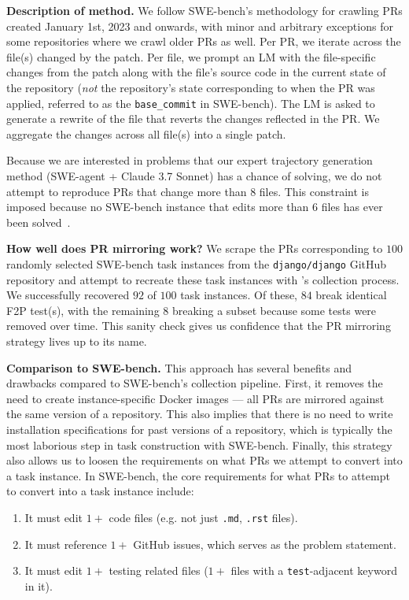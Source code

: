 \textbf{Description of method.} We follow SWE-bench's methodology for crawling PRs created January 1st, 2023 and onwards, with minor and arbitrary exceptions for some repositories where we crawl older PRs as well.
Per PR, we iterate across the file(s) changed by the patch.
Per file, we prompt an LM with the file-specific changes from the patch along with the file's source code in the current state of the repository (\textit{not} the repository's state corresponding to when the PR was applied, referred to as the \texttt{base\_commit} in SWE-bench).
The LM is asked to generate a rewrite of the file that reverts the changes reflected in the PR.
We aggregate the changes across all file(s) into a single patch.

Because we are interested in problems that our expert trajectory generation method (SWE-agent + Claude 3.7 Sonnet) has a chance of solving, we do not attempt to reproduce PRs that change more than $8$ files.
This constraint is imposed because no SWE-bench instance that edits more than $6$ files has ever been solved~\citep{jimenez2024leaderboard}.

\textbf{How well does PR mirroring work?} We scrape the PRs corresponding to $100$ randomly selected SWE-bench task instances from the \texttt{django/django} GitHub repository and attempt to recreate these task instances with \bugs{}'s collection process.
We successfully recovered $92$ of $100$ task instances.
Of these, $84$ break identical F2P test(s), with the remaining $8$ breaking a subset because some tests were removed over time.
This sanity check gives us confidence that the PR mirroring strategy lives up to its name.

\textbf{Comparison to SWE-bench.} This approach has several benefits and drawbacks compared to SWE-bench's collection pipeline.
First, it removes the need to create instance-specific Docker images --- all PRs are mirrored against the same version of a repository.
This also implies that there is no need to write installation specifications for past versions of a repository, which is typically the most laborious step in task construction with SWE-bench.
Finally, this strategy also allows us to loosen the requirements on what PRs we attempt to convert into a task instance.
In SWE-bench, the core requirements for what PRs to attempt to convert into a task instance include:
\begin{enumerate}
    \setlength\itemsep{0em}
    \item It must edit $1+$ code files (e.g. not just \texttt{.md}, \texttt{.rst} files).
    \item It must reference $1+$ GitHub issues, which serves as the problem statement.
    \item It must edit $1+$ testing related files ($1+$ files with a \texttt{test}-adjacent keyword in it).
\end{enumerate}


